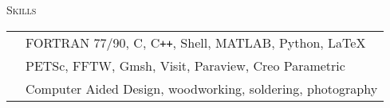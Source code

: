 \documentclass[10pt]{article}
\begin{document}
\vspace{-1.5em}
\begin{multicols}{2}
\textsc{Skills}
\columnbreak

\begin {table}[H]
\begin{tabular}{l l }
\hspace{-0.5em}{Programming  } & \hspace{-0.0em} FORTRAN 77/90, C, C\texttt{++}, Shell, MATLAB, Python, \LaTeX{}\\
\hspace{-0.5em}{Software     } & \hspace{-0.0em} PETSc, FFTW, Gmsh, Visit, Paraview, Creo Parametric\\
\hspace{-0.5em}{Miscellaneous} & \hspace{-0.0em} Computer Aided Design, woodworking, soldering, photography \\
\end{tabular}	
\end{table}

\end{multicols}
\vspace{-1.5em}
\end{document}
